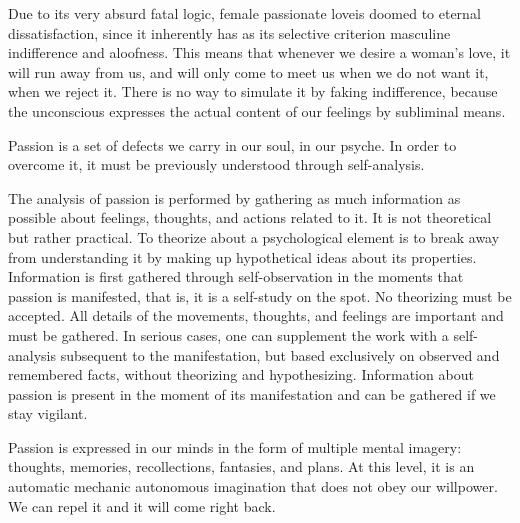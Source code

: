 

\par Due to its very absurd fatal logic, female passionate love\footnotemark[16] is doomed to eternal dissatisfaction, since it inherently has as its selective criterion masculine indifference and aloofness. This means that whenever we desire a woman's love, it will run away from us, and will only come to meet us when we do not want it, when we reject it\footnotemark[17]. There is no way to simulate it by faking indifference, because the unconscious expresses the actual content of our feelings by subliminal means.



\par Passion is a set of defects we carry in our soul, in our psyche. In order to overcome it, it must be previously understood through self-analysis.

\par The analysis of passion is performed by gathering as much information as possible about feelings, thoughts, and actions related to it. It is not theoretical but rather practical. To theorize about a psychological element is to break away from understanding it by making up hypothetical ideas about its properties. Information is first gathered through self-observation in the moments that passion is manifested, that is, it is a self-study on the spot. No theorizing must be accepted. All details of the movements, thoughts, and feelings are important and must be gathered. In serious cases, one can supplement the work with a self-analysis subsequent to the manifestation, but based exclusively on observed and remembered facts, without theorizing and hypothesizing. Information about passion is present in the moment of its manifestation and can be gathered if we stay vigilant.

\par Passion is expressed in our minds in the form of multiple mental imagery: thoughts, memories, recollections, fantasies, and plans. At this level, it is an automatic mechanic autonomous imagination that does not obey our willpower. We can repel it and it will come right back.

